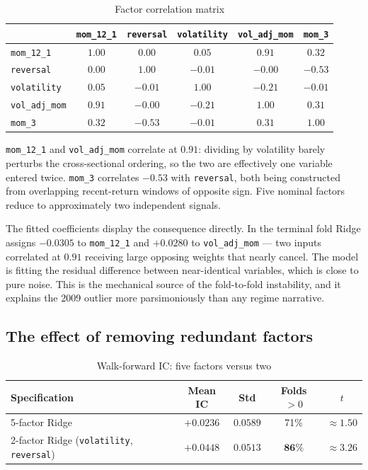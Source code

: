 \documentclass[11pt]{article}
\begin{document}
\begin{table}[H]
\centering
\caption{Factor correlation matrix}
\begin{tabular}{lccccc}
\toprule
& \texttt{mom\_12\_1} & \texttt{reversal} & \texttt{volatility} & \texttt{vol\_adj\_mom} & \texttt{mom\_3} \\
\midrule
\texttt{mom\_12\_1}    & $1.00$ & $0.00$  & $0.05$  & $\mathbf{0.91}$ & $0.32$ \\
\texttt{reversal}      & $0.00$ & $1.00$  & $-0.01$ & $-0.00$ & $\mathbf{-0.53}$ \\
\texttt{volatility}    & $0.05$ & $-0.01$ & $1.00$  & $-0.21$ & $-0.01$ \\
\texttt{vol\_adj\_mom} & $\mathbf{0.91}$ & $-0.00$ & $-0.21$ & $1.00$ & $0.31$ \\
\texttt{mom\_3}        & $0.32$ & $\mathbf{-0.53}$ & $-0.01$ & $0.31$ & $1.00$ \\
\bottomrule
\end{tabular}
\end{table}

\texttt{mom\_12\_1} and \texttt{vol\_adj\_mom} correlate at $0.91$: dividing by
volatility barely perturbs the cross-sectional ordering, so the two are
effectively one variable entered twice. \texttt{mom\_3} correlates $-0.53$ with
\texttt{reversal}, both being constructed from overlapping recent-return windows
of opposite sign. Five nominal factors reduce to approximately two independent
signals.

The fitted coefficients display the consequence directly. In the terminal fold
Ridge assigns $-0.0305$ to \texttt{mom\_12\_1} and $+0.0280$ to
\texttt{vol\_adj\_mom} --- two inputs correlated at $0.91$ receiving large
opposing weights that nearly cancel. The model is fitting the residual
difference between near-identical variables, which is close to pure noise. This
is the mechanical source of the fold-to-fold instability, and it explains the
2009 outlier more parsimoniously than any regime narrative.

\subsection{The effect of removing redundant factors}
\label{sec:twofactor}

\begin{table}[H]
\centering
\caption{Walk-forward IC: five factors versus two}
\begin{tabular}{lcccc}
\toprule
\textbf{Specification} & \textbf{Mean IC} & \textbf{Std} & \textbf{Folds $>0$} & \textbf{$t$} \\
\midrule
5-factor Ridge & $+0.0236$ & $0.0589$ & 71\% & $\approx 1.50$ \\
2-factor Ridge (\texttt{volatility}, \texttt{reversal})
               & $\mathbf{+0.0448}$ & $\mathbf{0.0513}$ & $\mathbf{86\%}$ & $\approx 3.26$ \\
\bottomrule
\end{tabular}
\end{table}
\end{document}

